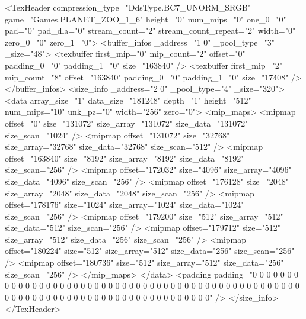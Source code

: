 <TexHeader compression_type="DdsType.BC7_UNORM_SRGB" game="Games.PLANET_ZOO_1_6" height="0" num_mips="0" one_0="0" pad="0" pad_dla="0" stream_count="2" stream_count_repeat="2" width="0" zero_0="0" zero_1="0">
	<buffer_infos _address="1 0" _pool_type="3" _size="48">
		<texbuffer first_mip="0" mip_count="2" offset="0" padding_0="0" padding_1="0" size="163840" />
		<texbuffer first_mip="2" mip_count="8" offset="163840" padding_0="0" padding_1="0" size="17408" />
	</buffer_infos>
	<size_info _address="2 0" _pool_type="4" _size="320">
		<data array_size="1" data_size="181248" depth="1" height="512" num_mips="10" unk_pz="0" width="256" zero="0">
			<mip_maps>
				<mipmap offset="0" size="131072" size_array="131072" size_data="131072" size_scan="1024" />
				<mipmap offset="131072" size="32768" size_array="32768" size_data="32768" size_scan="512" />
				<mipmap offset="163840" size="8192" size_array="8192" size_data="8192" size_scan="256" />
				<mipmap offset="172032" size="4096" size_array="4096" size_data="4096" size_scan="256" />
				<mipmap offset="176128" size="2048" size_array="2048" size_data="2048" size_scan="256" />
				<mipmap offset="178176" size="1024" size_array="1024" size_data="1024" size_scan="256" />
				<mipmap offset="179200" size="512" size_array="512" size_data="512" size_scan="256" />
				<mipmap offset="179712" size="512" size_array="512" size_data="256" size_scan="256" />
				<mipmap offset="180224" size="512" size_array="512" size_data="256" size_scan="256" />
				<mipmap offset="180736" size="512" size_array="512" size_data="256" size_scan="256" />
			</mip_maps>
		</data>
		<padding padding="0 0 0 0 0 0 0 0 0 0 0 0 0 0 0 0 0 0 0 0 0 0 0 0 0 0 0 0 0 0 0 0 0 0 0 0 0 0 0 0 0 0 0 0 0 0 0 0 0 0 0 0 0 0 0 0 0 0 0 0 0 0 0 0 0 0 0 0 0 0 0 0 0 0 0 0 0 0 0 0" />
	</size_info>
</TexHeader>
